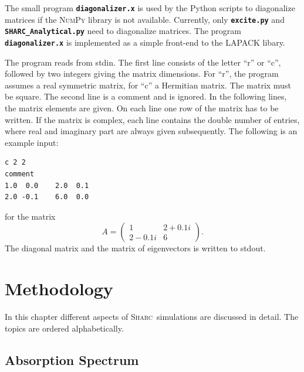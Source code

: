 \documentclass[a4paper,11pt,DIV=15,openany,twoside=false]{scrbook}
\newcommand{\sharc}{\textsc{Sharc}}
\newcommand{\ttt}[1]{\textbf{\texttt{#1}}}
\newenvironment{example}{
  \vspace{0mm}
  \definecolor{shadecolor}{HTML}{E4F4FF}
  \begin{shaded}
}{
  \end{shaded}
}
\begin{document}
The small program \ttt{diagonalizer.x} is used by the Python scripts to diagonalize matrices if the \textsc{NumPy} library is not available. Currently, only \ttt{excite.py} and \ttt{SHARC\_Analytical.py} need to diagonalize matrices. The program \ttt{diagonalizer.x} is implemented as a simple front-end to the LAPACK libary.

The program reads from stdin. The first line consists of the letter ``r'' or ``c'', followed by two integers giving the matrix dimensions. For ``r'', the program assumes a real symmetric matrix, for ``c'' a Hermitian matrix. The matrix must be square.
The second line is a comment and is ignored.
In the following lines, the matrix elements are given. On each line one row of the matrix has to be written. If the matrix is complex, each line contains the double number of entries, where real and imaginary part are always given subsequently.
The following is an example input:
\begin{example}
\footnotesize\begin{verbatim}
c 2 2
comment
1.0  0.0    2.0  0.1
2.0 -0.1    6.0  0.0
\end{verbatim}
\end{example}

\normalsize
for the matrix 
\begin{equation}
  A=\begin{pmatrix}
      1 &2+0.1i\\
      2-0.1i&6
    \end{pmatrix}.\nonumber
\end{equation}
The diagonal matrix and the matrix of eigenvectors is written to stdout.




\chapter{Methodology}

In this chapter different aspects of \sharc\ simulations are discussed in detail. The topics are ordered alphabetically.


\section{Absorption Spectrum}\label{met:spectrum}
\end{document}
